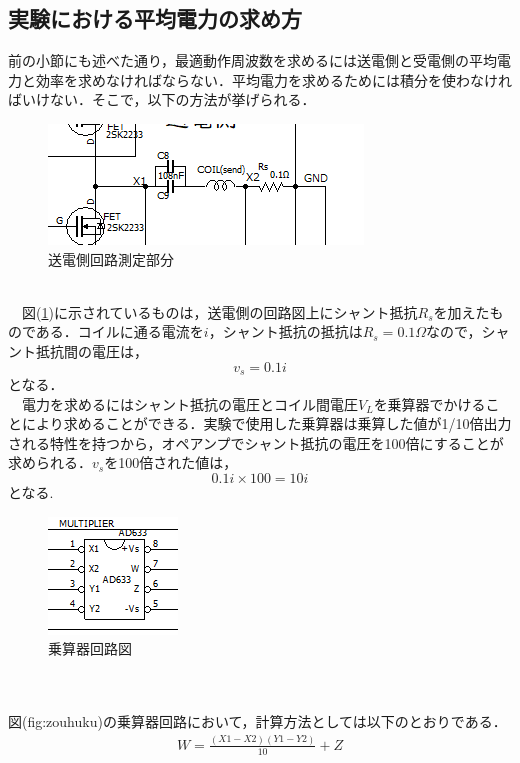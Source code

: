 \documentclass[12pt]{jarticle}
\begin{document}
 \subsection{実験における平均電力の求め方}
 前の小節にも述べた通り，最適動作周波数を求めるには送電側と受電側の平均電力と効率を求めなければならない．平均電力を求めるためには積分を使わなければいけない．そこで，以下の方法が挙げられる．
 \begin{figure}[h]
 	\centering
 	\includegraphics[]{191127shunt.png}
 	\caption{送電側回路測定部分}
 	\label{fig:shunt}
 \end{figure}
\\　図(\ref{fig:shunt})に示されているものは，送電側の回路図上にシャント抵抗$R_s$を加えたものである．コイルに通る電流を$i$，シャント抵抗の抵抗は$R_s=0.1\Omega$なので，シャント抵抗間の電圧は，
\begin{equation}
v_s=0.1i
\end{equation}
となる．\\
　電力を求めるにはシャント抵抗の電圧とコイル間電圧$V_L$を乗算器でかけることにより求めることができる．実験で使用した乗算器は乗算した値が1/10倍出力される特性を持つから，オペアンプでシャント抵抗の電圧を100倍にすることが求められる．$v_s$を100倍された値は，
\begin{equation}
0.1i \times 100=10i
\end{equation}
となる.
 \begin{figure}[h]
	\centering
	\includegraphics[]{191127zouhuku.png}
	\caption{乗算器回路図}
	\label{fig:zouhuku}
\end{figure}
　\\ \\図(fig:zouhuku)の乗算器回路において，計算方法としては以下のとおりである．
\begin{eqnarray}
W=\frac{(X1-X2)(Y1-Y2)}{10}+Z
\end{eqnarray}
\end{document}
